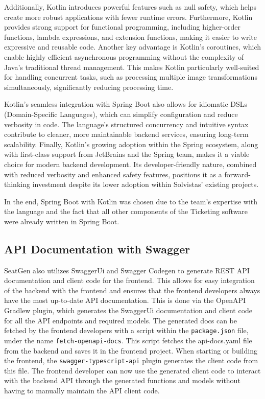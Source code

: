 Additionally, Kotlin introduces powerful features such as null safety, which helps create more robust applications with fewer runtime errors. Furthermore, Kotlin provides strong support for functional programming, including higher-order functions, lambda expressions, and extension functions, making it easier to write expressive and reusable code. Another key advantage is Kotlin’s coroutines, which enable highly efficient asynchronous programming without the complexity of Java’s traditional thread management. This makes Kotlin particularly well-suited for handling concurrent tasks, such as processing multiple image transformations simultaneously, significantly reducing processing time.

Kotlin’s seamless integration with Spring Boot also allows for idiomatic DSLs (Domain-Specific Languages), which can simplify configuration and reduce verbosity in code. The language’s structured concurrency and intuitive syntax contribute to cleaner, more maintainable backend services, ensuring long-term scalability. Finally, Kotlin’s growing adoption within the Spring ecosystem, along with first-class support from JetBrains and the Spring team, makes it a viable choice for modern backend development. Its developer-friendly nature, combined with reduced verbosity and enhanced safety features, positions it as a forward-thinking investment despite its lower adoption within Solvistas' existing projects.

In the end, Spring Boot with Kotlin was chosen due to the team's expertise with the language and the fact that all other components of the Ticketing software were already written in Spring Boot.

\subsection{API Documentation with Swagger}
SeatGen also utilizes SwaggerUi and Swagger Codegen to generate REST API documentation and client code for the frontend. This allows for easy integration of the backend with the frontend and ensures that the frontend developers always have the most up-to-date API documentation. This is done via the OpenAPI Gradlew plugin, which generates the SwaggerUi documentation and client code for all the API endpoints and required models. The generated docs can be fetched by the frontend developers with a script within the \texttt{package.json} file, under the name \texttt{fetch-openapi-docs}. This script fetches the api-docs.yaml file from the backend and saves it in the frontend project. When starting or building the frontend, the \texttt{swagger-typescript-api} plugin generates the client code from this file. The frontend developer can now use the generated client code to interact with the backend API through the generated functions and models without having to manually maintain the API client code.



